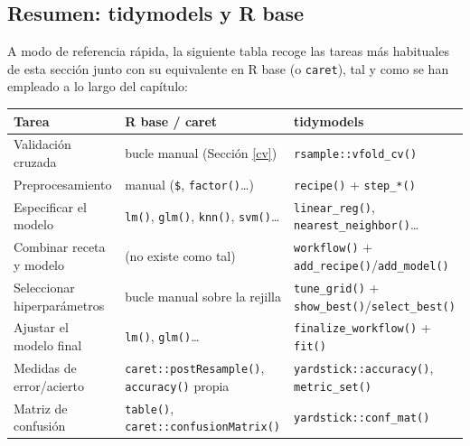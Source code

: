 \documentclass[
]{book}
\newcounter{none} %
\theoremstyle{break}
\theoremstyle{nonumberplain}
\begin{document}
\subsection{Resumen: tidymodels y R base}\label{resumen-tidymodels}

A modo de referencia rápida, la siguiente tabla recoge las tareas más habituales de esta sección junto con su equivalente en R base (o \texttt{caret}), tal y como se han empleado a lo largo del capítulo:

{\def\LTcaptype{none} %
\begin{longtable}[]{@{}
  >{\raggedright\arraybackslash}p{}
  >{\raggedright\arraybackslash}p{}
  >{\raggedright\arraybackslash}p{}@{}}
\toprule\noalign{}
\begin{minipage}[b]{\linewidth}\raggedright
Tarea
\end{minipage} & \begin{minipage}[b]{\linewidth}\raggedright
R base / caret
\end{minipage} & \begin{minipage}[b]{\linewidth}\raggedright
tidymodels
\end{minipage} \\
\midrule\noalign{}
\endhead
\bottomrule\noalign{}
\endlastfoot
Validación cruzada & bucle manual (Sección \ref{cv}) & \texttt{rsample::vfold\_cv()} \\
Preprocesamiento & manual (\texttt{\$}, \texttt{factor()}\ldots) & \texttt{recipe()} + \texttt{step\_*()} \\
Especificar el modelo & \texttt{lm()}, \texttt{glm()}, \texttt{knn()}, \texttt{svm()}\ldots{} & \texttt{linear\_reg()}, \texttt{nearest\_neighbor()}\ldots{} \\
Combinar receta y modelo & (no existe como tal) & \texttt{workflow()} + \texttt{add\_recipe()}/\texttt{add\_model()} \\
Seleccionar hiperparámetros & bucle manual sobre la rejilla & \texttt{tune\_grid()} + \texttt{show\_best()}/\texttt{select\_best()} \\
Ajustar el modelo final & \texttt{lm()}, \texttt{glm()}\ldots{} & \texttt{finalize\_workflow()} + \texttt{fit()} \\
Medidas de error/acierto & \texttt{caret::postResample()}, \texttt{accuracy()} propia & \texttt{yardstick::accuracy()}, \texttt{metric\_set()} \\
Matriz de confusión & \texttt{table()}, \texttt{caret::confusionMatrix()} & \texttt{yardstick::conf\_mat()} \\

\end{longtable}}
\end{document}
